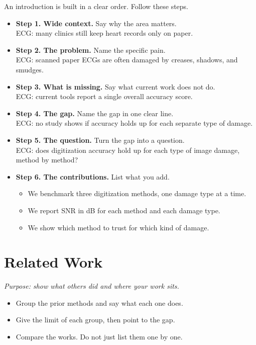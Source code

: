 \documentclass[11pt]{article}
\begin{document}
 An introduction is built in a clear order. Follow these steps.

\begin{itemize}
\item \textbf{Step 1. Wide context.} Say why the area matters. \\
ECG: many clinics still keep heart records only on paper.
\item \textbf{Step 2. The problem.} Name the specific pain. \\
ECG: \textcolor{cProblem}{scanned paper ECGs are often damaged by creases, shadows, and smudges.}
\item \textbf{Step 3. What is missing.} Say what current work does not do. \\
ECG: current tools report a single overall accuracy score.
\item \textbf{Step 4. The gap.} Name the gap in one clear line. \\
ECG: \textcolor{cGap}{no study shows if accuracy holds up for each separate type of damage.}
\item \textbf{Step 5. The question.} Turn the gap into a question. \\
ECG: does digitization accuracy hold up for each type of image damage, method by method?
\item \textbf{Step 6. The contributions.} List what you add.
\begin{itemize}
\item \textcolor{cMethod}{We benchmark three digitization methods, one damage type at a time.}
\item \textcolor{cResult}{We report SNR in dB for each method and each damage type.}
\item \textcolor{cResult}{We show which method to trust for which kind of damage.}
\end{itemize}
\end{itemize}

\section{Related Work}
\textit{Purpose: show what others did and where your work sits.}

\begin{itemize}
\item Group the prior \textcolor{cMethod}{methods} and say what each one does.
\item Give the limit of each group, then point to the \textcolor{cGap}{gap}.
\item Compare the works. Do not just list them one by one.
\end{itemize}
\end{document}
